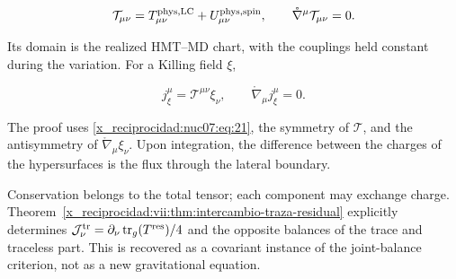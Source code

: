 \begin{equation}
\mathcal T_{\mu\nu}
=T^{\rm phys,LC}_{\mu\nu}+U^{\rm phys,spin}_{\mu\nu},
\qquad
\mathring\nabla^\mu\mathcal T_{\mu\nu}=0.
\label{x_reciprocidad:nuc07:eq:21}
\end{equation}

Its domain is the realized HMT–MD chart, with the couplings held constant during the variation. For a Killing field \(\xi\),

\begin{equation}
j^\mu_\xi=\mathcal T^{\mu\nu}\xi_\nu,\qquad
\mathring\nabla_\mu j^\mu_\xi=0.
\label{x_reciprocidad:nuc07:eq:22}
\end{equation}

The proof uses \eqref{x_reciprocidad:nuc07:eq:21}, the symmetry of \(\mathcal T\), and the antisymmetry of \(\mathring\nabla_\mu\xi_\nu\). Upon integration, the difference between the charges of the hypersurfaces is the flux through the lateral boundary.

Conservation belongs to the total tensor; each component may exchange charge. Theorem~\ref{x_reciprocidad:vii:thm:intercambio-traza-residual} explicitly determines \(\mathcal J^{\rm tr}_\nu=\partial_\nu\operatorname{tr}_g(T^{\rm res})/4\) and the opposite balances of the trace and traceless part. This is recovered as a covariant instance of the joint-balance criterion, not as a new gravitational equation.
